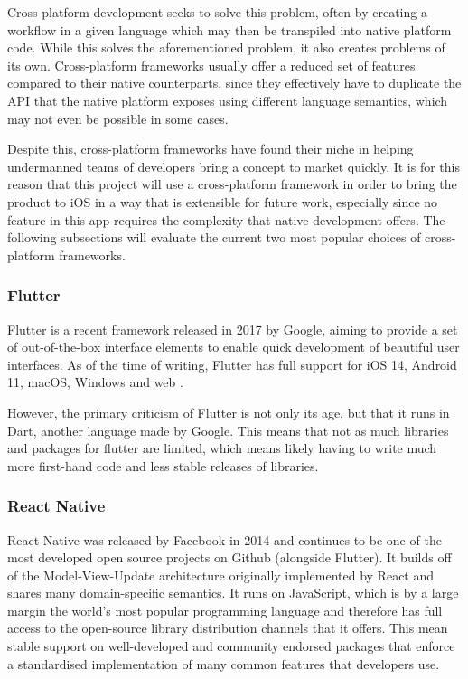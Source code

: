 Cross-platform development seeks to solve this problem, often by creating a workflow in a given language which may then be transpiled into native platform code. While this solves the aforementioned problem, it also creates problems of its own. Cross-platform frameworks usually offer a reduced set of features compared to their native counterparts, since they effectively have to duplicate the API that the native platform exposes using different language semantics, which may not even be possible in some cases.

Despite this, cross-platform frameworks have found their niche in helping undermanned teams of developers bring a concept to market quickly. It is for this reason that this project will use a cross-platform framework in order to bring the product to iOS in a way that is extensible for future work, especially since no feature in this app requires the complexity that native development offers. The following subsections will evaluate the current two most popular choices of cross-platform frameworks.

\subsubsection{Flutter}
Flutter is a recent framework released in 2017 by Google, aiming to provide a set of out-of-the-box interface elements to enable quick development of beautiful user interfaces. As of the time of writing, Flutter has full support for iOS 14, Android 11, macOS, Windows and web \cite{fluttersupportedplatforms}.

However, the primary criticism of Flutter is not only its age, but that it runs in Dart, another language made by Google. This means that not as much libraries and packages for flutter are limited, which means likely having to write much more first-hand code and less stable releases of libraries.

\subsubsection{React Native}
React Native was released by Facebook in 2014 and continues to be one of the most developed open source projects on Github (alongside Flutter). It builds off of the Model-View-Update architecture originally implemented by React and shares many domain-specific semantics. It runs on JavaScript, which is by a large margin the world's most popular programming language \cite{sfdevsurvey} and therefore has full access to the open-source library distribution channels that it offers. This mean stable support on well-developed and community endorsed packages that enforce a standardised implementation of many common features that developers use.

